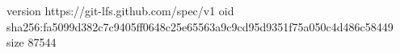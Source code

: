 version https://git-lfs.github.com/spec/v1
oid sha256:fa5099d382c7c9405ff0648c25e65563a9c9cd95d9351f75a050c4d486c58449
size 87544
